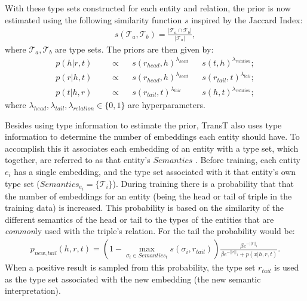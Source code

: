 With these type sets constructed for each entity and relation, the prior is now estimated using the following similarity function $s$ inspired by the Jaccard Index:
\begin{align}
s(\mathcal{T}_a, \mathcal{T}_b) = \frac{| \mathcal{T}_a \cap \mathcal{T}_b |}{| \mathcal{T}_a |},
%
\end{align}
where $\mathcal{T}_a, \mathcal{T}_b$ are type sets. The priors are then given by:
\begin{align} \label{formula:p_hrt}
    p(h | r,t)& & &\propto & &s(r_{head}, h)^{\lambda_{head}} & &s(t, h)^{\lambda_{relation}};
\\  \label{formula:p_rht}
    p(r | h,t)& & &\propto & &s(r_{head}, h)^{\lambda_{head}} & &s(r_{tail}, t)^{\lambda_{tail}};
\\  \label{formula:p_thr}
    p(t | h,r)& & &\propto & &s(r_{tail}, t)^{\lambda_{tail}} & &s(h, t)^{\lambda_{relation}};
\end{align}
where $\lambda_{head}, \lambda_{tail}, \lambda_{relation} \in \{ 0, 1 \}$ are hyperparameters.

Besides using type information to estimate the prior, TransT also uses type information to determine the number of embeddings each entity should have. To accomplish this it associates each embedding of an entity with a type set, which together, are referred to as that entity's $Semantics$%
. 
Before training, each entity $e_i$ has a single embedding, and the type set associated with it that entity's own type set ($Semantics_{e_i} = \{ \mathcal{T}_i \}$).
%
During training there is a probability that that the number of embeddings for an entity (being the head or tail of triple in the training data) is increased. This probability is based on the similarity of the different semantics of the head or tail to the types of the entities that are \textit{common}ly used with the triple's relation. For the tail the probability would be:
\begin{align}
    p_{new,tail}(h,r,t) =   \left( 1 - \max_{\sigma_i \in Semantics_t} s(\sigma_i, r_{tail}) \right)
                            \frac{\beta e^{-||r||_1}}{\beta e^{-||r||_1} + p(x | h,r,t)}.
\end{align}
When a positive result is sampled from this probability, the type set $r_{tail}$ is used as the type set associated with the new embedding (the new semantic interpretation).


